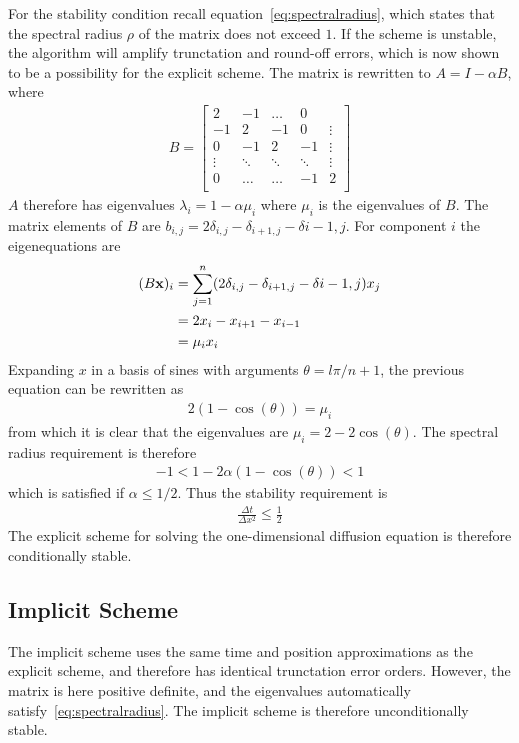 \documentclass[aps,reprint]{revtex4-1}
\begin{document}
For the stability condition recall equation~\ref{eq:spectralradius}, which states
that the spectral radius $\rho$ of the matrix does not exceed $1$. If the scheme is
unstable, the algorithm will amplify trunctation and round-off errors, which is
now shown to be a possibility for the explicit scheme. The matrix
is rewritten to $A = I - \alpha B$, where
\begin{align*}
  B = \begin{bmatrix}
        2  & -1 & \hdots  & 0      \\
        -1 & 2  & -1 & 0       & \vdots \\
        0  & -1 & 2  & -1  & \vdots \\
        \vdots       & \ddots      & \ddots       & \ddots  & \vdots \\
        0  & \hdots  & \hdots       & -1  & 2 \\
      \end{bmatrix}
\end{align*}
$A$ therefore has eigenvalues $\lambda_i = 1 - \alpha \mu_i$ where $\mu_i$ is
the eigenvalues of $B$. The matrix elements of $B$ are $b_{i,j} = 2\delta_{i,j} - \delta_{i+1,j} - \delta{i-1,j}$.
For component $i$ the eigenequations are
\begin{align*}
  (B\vb{x})_i &= \sum_{j=1}^{n} (2\delta_{i,j} - \delta_{i+1,j} - \delta{i-1,j})x_j \\
              &= 2x_i - x_{i+1} - x_{i-1} \\
              &= \mu_i x_i
\end{align*}
Expanding $x$ in a basis of sines with arguments $\theta = l \pi / n + 1$, the previous equation can be rewritten as
\begin{align*}
  2(1 - \cos{(\theta)}) = \mu_i
\end{align*}
from which it is clear that the eigenvalues are $\mu_i = 2 - 2 \cos{(\theta)}$. The
spectral radius requirement is therefore
\begin{align*}
  -1 < 1 - 2 \alpha (1 - \cos{(\theta)}) < 1
\end{align*}
which is satisfied if $\alpha \leq 1/2$. Thus the stability requirement is
\begin{align}
  \frac{\Delta{t}}{\Delta{x^2}} \leq \frac{1}{2}
\end{align}
The explicit scheme for solving the one-dimensional diffusion equation is therefore
conditionally stable.

\subsection{Implicit Scheme}
The implicit scheme uses the same time and position approximations as the explicit
scheme, and therefore has identical trunctation error orders. However, the matrix
is here positive definite, and the eigenvalues automatically satisfy~\ref{eq:spectralradius}.
The implicit scheme is therefore unconditionally stable.
\end{document}
